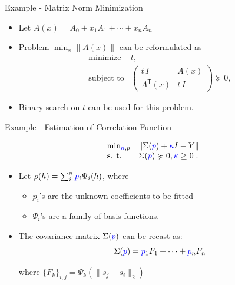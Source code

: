 \documentclass[
  ignorenonframetext,
  aspectratio=169,
  serif,onlymath]{beamer}
\providecommand{\tightlist}{%
  \setlength{\itemsep}{0pt}\setlength{\parskip}{0pt}}
\begin{document}
\begin{frame}{Example - Matrix Norm Minimization}
\protect\hypertarget{example---matrix-norm-minimization}{}

\begin{itemize}
\tightlist
\item
  Let \(A(x) = A_0 + x_1 A_1 + \cdots + x_n A_n\)
\item
  Problem \(\min_x \| A(x) \|\) can be reformulated as
  \[\begin{array}{ll}
       \text{minimize}      & t, \\
       \text{subject to}    & \left(
   \begin{array}{cc}
    t\,I   & A(x) \\
    A^\mathsf{T}(x) & t\,I
   \end{array} \right) \succeq 0,
   \end{array}\]
\item
  Binary search on \(t\) can be used for this problem.
\end{itemize}

\end{frame}

\begin{frame}{Example - Estimation of Correlation Function}
\protect\hypertarget{example---estimation-of-correlation-function}{}

\[\begin{array}{ll}
   \min_{{\color{blue}\kappa}, p}   & \| \Sigma({\color{blue}p}) + {\color{blue}\kappa} I - Y \| \\
   \text{s. t.} & \Sigma({\color{blue}p}) \succcurlyeq 0,  {\color{blue}\kappa} \ge 0 \; .\\
 \end{array}\]

\begin{itemize}
\item
  Let \(\rho(h) = \sum_i^n {\color{blue}p}_i \Psi_i(h)\), where

  \begin{itemize}
  \tightlist
  \item
    \(p_i\)'s are the unknown coefficients to be fitted
  \item
    \(\Psi_i\)'s are a family of basis functions.
  \end{itemize}
\item
  The covariance matrix \(\Sigma({\color{blue}p})\) can be recast as:
  \[\Sigma({\color{blue}p}) = {\color{blue}p}_1 F_1 + \cdots + {\color{blue}p}_n F_n\]

  where \(\{F_k\}_{i,j} =\Psi_k( \| s_j - s_i \|_2)\)
\end{itemize}

\end{frame}
\end{document}
